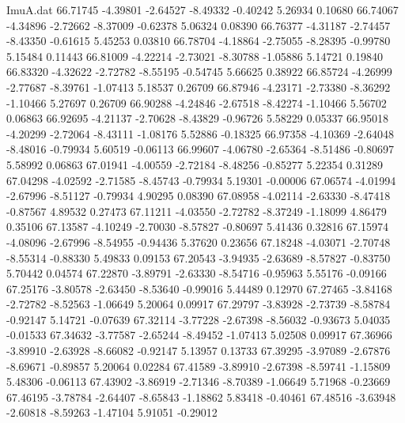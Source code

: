 \begin{filecontents}{ImuA.dat}
  66.71745   -4.39801   -2.64527   -8.49332   -0.40242    5.26934    0.10680
  66.74067   -4.34896   -2.72662   -8.37009   -0.62378    5.06324    0.08390
  66.76377   -4.31187   -2.74457   -8.43350   -0.61615    5.45253    0.03810
  66.78704   -4.18864   -2.75055   -8.28395   -0.99780    5.15484    0.11443
  66.81009   -4.22214   -2.73021   -8.30788   -1.05886    5.14721    0.19840
  66.83320   -4.32622   -2.72782   -8.55195   -0.54745    5.66625    0.38922
  66.85724   -4.26999   -2.77687   -8.39761   -1.07413    5.18537    0.26709
  66.87946   -4.23171   -2.73380   -8.36292   -1.10466    5.27697    0.26709
  66.90288   -4.24846   -2.67518   -8.42274   -1.10466    5.56702    0.06863
  66.92695   -4.21137   -2.70628   -8.43829   -0.96726    5.58229    0.05337
  66.95018   -4.20299   -2.72064   -8.43111   -1.08176    5.52886   -0.18325
  66.97358   -4.10369   -2.64048   -8.48016   -0.79934    5.60519   -0.06113
  66.99607   -4.06780   -2.65364   -8.51486   -0.80697    5.58992    0.06863
  67.01941   -4.00559   -2.72184   -8.48256   -0.85277    5.22354    0.31289
  67.04298   -4.02592   -2.71585   -8.45743   -0.79934    5.19301   -0.00006
  67.06574   -4.01994   -2.67996   -8.51127   -0.79934    4.90295    0.08390
  67.08958   -4.02114   -2.63330   -8.47418   -0.87567    4.89532    0.27473
  67.11211   -4.03550   -2.72782   -8.37249   -1.18099    4.86479    0.35106
  67.13587   -4.10249   -2.70030   -8.57827   -0.80697    5.41436    0.32816
  67.15974   -4.08096   -2.67996   -8.54955   -0.94436    5.37620    0.23656
  67.18248   -4.03071   -2.70748   -8.55314   -0.88330    5.49833    0.09153
  67.20543   -3.94935   -2.63689   -8.57827   -0.83750    5.70442    0.04574
  67.22870   -3.89791   -2.63330   -8.54716   -0.95963    5.55176   -0.09166
  67.25176   -3.80578   -2.63450   -8.53640   -0.99016    5.44489    0.12970
  67.27465   -3.84168   -2.72782   -8.52563   -1.06649    5.20064    0.09917
  67.29797   -3.83928   -2.73739   -8.58784   -0.92147    5.14721   -0.07639
  67.32114   -3.77228   -2.67398   -8.56032   -0.93673    5.04035   -0.01533
  67.34632   -3.77587   -2.65244   -8.49452   -1.07413    5.02508    0.09917
  67.36966   -3.89910   -2.63928   -8.66082   -0.92147    5.13957    0.13733
  67.39295   -3.97089   -2.67876   -8.69671   -0.89857    5.20064    0.02284
  67.41589   -3.89910   -2.67398   -8.59741   -1.15809    5.48306   -0.06113
  67.43902   -3.86919   -2.71346   -8.70389   -1.06649    5.71968   -0.23669
  67.46195   -3.78784   -2.64407   -8.65843   -1.18862    5.83418   -0.40461
  67.48516   -3.63948   -2.60818   -8.59263   -1.47104    5.91051   -0.29012

\end{filecontents}
